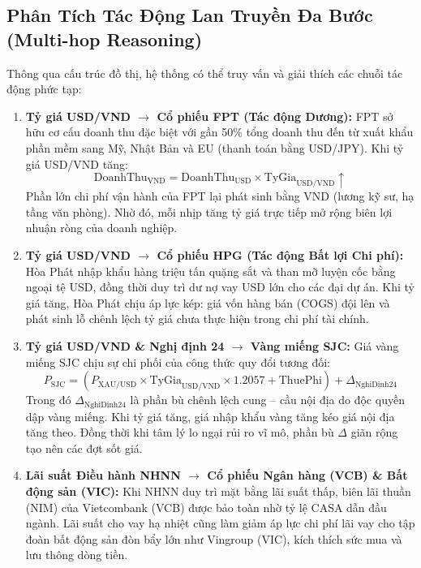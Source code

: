\documentclass[12pt,a4paper]{report}
\begin{document}
\subsection{Phân Tích Tác Động Lan Truyền Đa Bước (Multi-hop Reasoning)}
Thông qua cấu trúc đồ thị, hệ thống có thể truy vấn và giải thích các chuỗi tác động phức tạp:
\enlargethispage{2\baselineskip}
\begin{enumerate}[itemsep=1pt, parsep=0pt, topsep=2pt]
    \item \textbf{Tỷ giá USD/VND $\to$ Cổ phiếu FPT (Tác động Dương):} FPT sở hữu cơ cấu doanh thu đặc biệt với gần 50\% tổng doanh thu đến từ xuất khẩu phần mềm sang Mỹ, Nhật Bản và EU (thanh toán bằng USD/JPY). Khi tỷ giá USD/VND tăng:
    \begin{equation}
        \text{DoanhThu}_{\text{VND}} = \text{DoanhThu}_{\text{USD}} \times \text{TyGia}_{\text{USD/VND}} \uparrow
    \end{equation}
    Phần lớn chi phí vận hành của FPT lại phát sinh bằng VND (lương kỹ sư, hạ tầng văn phòng). Nhờ đó, mỗi nhịp tăng tỷ giá trực tiếp mở rộng biên lợi nhuận ròng của doanh nghiệp.
    \item \textbf{Tỷ giá USD/VND $\to$ Cổ phiếu HPG (Tác động Bất lợi Chi phí):} Hòa Phát nhập khẩu hàng triệu tấn quặng sắt và than mỡ luyện cốc bằng ngoại tệ USD, đồng thời duy trì dư nợ vay USD lớn cho các đại dự án. Khi tỷ giá tăng, Hòa Phát chịu áp lực kép: giá vốn hàng bán (COGS) đội lên và phát sinh lỗ chênh lệch tỷ giá chưa thực hiện trong chi phí tài chính.
    \item \textbf{Tỷ giá USD/VND \& Nghị định 24 $\to$ Vàng miếng SJC:}
    Giá vàng miếng SJC chịu sự chi phối của công thức quy đổi tương đối:
    \begin{equation}
        P_{\text{SJC}} = \left( P_{\text{XAU/USD}} \times \text{TyGia}_{\text{USD/VND}} \times 1.2057 + \text{ThuePhi} \right) + \Delta_{\text{NghiDinh24}}
    \end{equation}
    Trong đó $\Delta_{\text{NghiDinh24}}$ là phần bù chênh lệch cung -- cầu nội địa do độc quyền dập vàng miếng. Khi tỷ giá tăng, giá nhập khẩu vàng tăng kéo giá nội địa tăng theo. Đồng thời khi tâm lý lo ngại rủi ro vĩ mô, phần bù $\Delta$ giãn rộng tạo nên các đợt sốt giá.
    \item \textbf{Lãi suất Điều hành NHNN $\to$ Cổ phiếu Ngân hàng (VCB) \& Bất động sản (VIC):}
    Khi NHNN duy trì mặt bằng lãi suất thấp, biên lãi thuần (NIM) của Vietcombank (VCB) được bảo toàn nhờ tỷ lệ CASA dẫn đầu ngành. Lãi suất cho vay hạ nhiệt cũng làm giảm áp lực chi phí lãi vay cho tập đoàn bất động sản đòn bẩy lớn như Vingroup (VIC), kích thích sức mua và lưu thông dòng tiền.
\end{enumerate}
\end{document}
